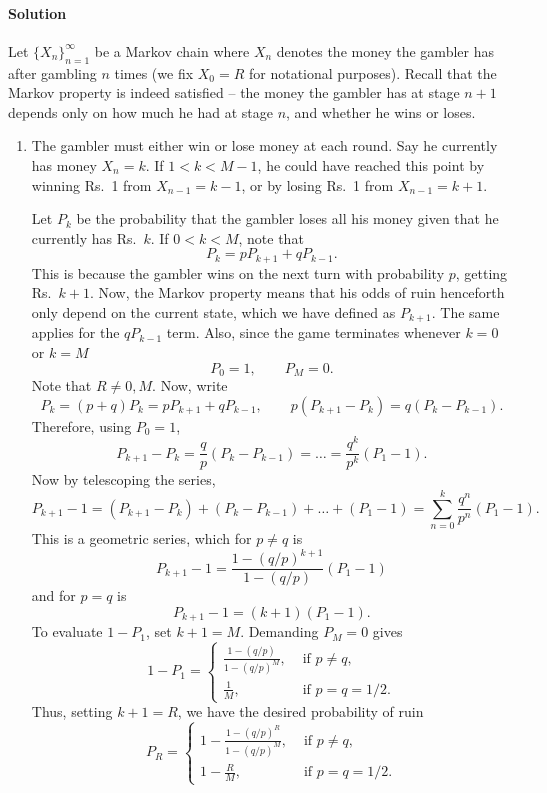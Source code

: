 \documentclass[10pt]{article}
\newcounter{prob}
\def\solution{\paragraph{Solution}}
\begin{document}
        \solution 
        Let $\{X_n\}_{n = 1}^\infty$ be a Markov chain where $X_n$ denotes the money
        the gambler has after gambling $n$ times (we fix $X_0 = R$ for notational
        purposes). Recall that the Markov property is indeed satisfied -- the money
        the gambler has at stage $n + 1$ depends only on how much he had at stage
        $n$, and whether he wins or loses.
        \begin{enumerate}
            \item The gambler must either win or lose money at each round. Say he
            currently has money $X_n = k$. If $1 < k < M - 1$, he could have reached
            this point by winning Rs.\ 1 from $X_{n - 1} = k - 1$, or by losing Rs.\
            1 from $X_{n - 1} = k + 1$. 

            Let $P_k$ be the probability that the gambler loses all his money
            given that he currently has Rs.\ $k$. If $0 < k < M$, note that \[
                P_{k} = pP_{k + 1} + qP_{k - 1}.
            \] This is because the gambler wins on the next turn with probability
            $p$, getting Rs.\ $k + 1$. Now, the Markov property means that his odds
            of ruin henceforth only depend on the current state, which we have
            defined as $P_{k + 1}$. The same applies for the $qP_{k - 1}$ term.
            Also, since the game terminates whenever $k = 0$ or $k = M$ \[
                P_0 = 1,\qquad P_M = 0.
            \] Note that $R \neq 0, M$. Now, write \[
                P_k = (p + q)P_k = pP_{k + 1} + qP_{k - 1}, \qquad p(P_{k + 1} -
                P_k) = q(P_k - P_{k - 1}).
            \] Therefore, using $P_0 = 1$, \[
                P_{k + 1} - P_k = \frac{q}{p}\left(P_k - P_{k - 1}\right) =
                \dots = \frac{q^k}{p^k}(P_1 - 1).
            \] Now by telescoping the series, \[
                P_{k + 1} - 1 = (P_{k + 1} - P_k) + (P_{k} - P_{k - 1}) + \dots +
                (P_1 - 1) = \sum_{n = 0}^k \frac{q^n}{p^n}(P_1 - 1). 
            \] This is a geometric series, which for $p \neq q$ is \[
                P_{k + 1} - 1 = \frac{1 - (q / p)^{k + 1}}{1 - (q /p)}(P_1 - 1)
            \] and for $p = q$ is \[
                P_{k + 1} - 1 = (k + 1)(P_1 - 1).
            \] To evaluate $1 - P_1$, set $k + 1 = M$. Demanding $P_M = 0$ gives \[
                1 - P_1 = \begin{cases}
                    \frac{1 - (q / p)}{1 - (q / p)^M}, &\text{ if }p \neq q, \\
                    \frac{1}{M}, &\text{ if } p = q = 1 /2.
                \end{cases}
            \] Thus, setting $k + 1 = R$, we have the desired probability of ruin \[
                P_R = \begin{cases}
                    1 - \frac{1 - (q / p)^R}{1 - (q / p)^M}, &\text{ if }p \neq q, \\
                    1 - \frac{R}{M}, &\text{ if } p = q = 1 /2.
                \end{cases}
            \] 


\end{enumerate}
\end{document}
